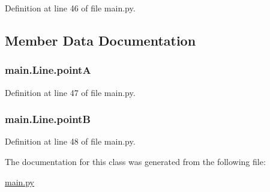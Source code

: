 Definition at line 46 of file main.\+py.



\subsection{Member Data Documentation}
\subsubsection[{\texorpdfstring{pointA}{pointA}}]{\setlength{\rightskip}{0pt plus 5cm}main.\+Line.\+pointA}\hypertarget{classmain_1_1Line_a522b7fa9103439ada49cbf790b994333}{}\label{classmain_1_1Line_a522b7fa9103439ada49cbf790b994333}


Definition at line 47 of file main.\+py.

\subsubsection[{\texorpdfstring{pointB}{pointB}}]{\setlength{\rightskip}{0pt plus 5cm}main.\+Line.\+pointB}\hypertarget{classmain_1_1Line_a1ee96cc321a947493a55cd92448bbced}{}\label{classmain_1_1Line_a1ee96cc321a947493a55cd92448bbced}


Definition at line 48 of file main.\+py.



The documentation for this class was generated from the following file\+:\begin{DoxyCompactItemize}
\item 
\hyperlink{main_8py}{main.\+py}\end{DoxyCompactItemize}
